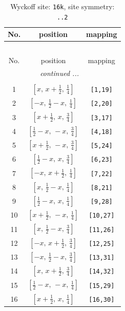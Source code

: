 \documentclass[fleqn,8pt]{jsarticle}
\begin{document}
\begin{longtable}{ccc}
\caption{Wyckoff site: {\tt 16k}, site symmetry: {\tt ..2}}
 \\
 \hline \hline
No. & position & mapping \\ \hline \endfirsthead

\multicolumn{2}{l}{\tablename\ \thetable{}} \\
 \hline \hline
No. & position & mapping \\ \hline \endhead

 \hline \hline
\multicolumn{2}{r}{\footnotesize\it continued ...} \\ \endfoot

 \hline \hline
\multicolumn{2}{r}{} \\ \endlastfoot

1 & $\left[ x,\, x + \frac{1}{2},\, \frac{1}{4} \right]$ & {\tt [1,19]} \\ \hline
2 & $\left[ - x,\, \frac{1}{2} - x,\, \frac{1}{4} \right]$ & {\tt [2,20]} \\ \hline
3 & $\left[ x + \frac{1}{2},\, x,\, \frac{3}{4} \right]$ & {\tt [3,17]} \\ \hline
4 & $\left[ \frac{1}{2} - x,\, - x,\, \frac{3}{4} \right]$ & {\tt [4,18]} \\ \hline
5 & $\left[ x + \frac{1}{2},\, - x,\, \frac{3}{4} \right]$ & {\tt [5,24]} \\ \hline
6 & $\left[ \frac{1}{2} - x,\, x,\, \frac{3}{4} \right]$ & {\tt [6,23]} \\ \hline
7 & $\left[ - x,\, x + \frac{1}{2},\, \frac{1}{4} \right]$ & {\tt [7,22]} \\ \hline
8 & $\left[ x,\, \frac{1}{2} - x,\, \frac{1}{4} \right]$ & {\tt [8,21]} \\ \hline
9 & $\left[ \frac{1}{2} - x,\, x,\, \frac{1}{4} \right]$ & {\tt [9,28]} \\ \hline
10 & $\left[ x + \frac{1}{2},\, - x,\, \frac{1}{4} \right]$ & {\tt [10,27]} \\ \hline
11 & $\left[ x,\, \frac{1}{2} - x,\, \frac{3}{4} \right]$ & {\tt [11,26]} \\ \hline
12 & $\left[ - x,\, x + \frac{1}{2},\, \frac{3}{4} \right]$ & {\tt [12,25]} \\ \hline
13 & $\left[ - x,\, \frac{1}{2} - x,\, \frac{3}{4} \right]$ & {\tt [13,31]} \\ \hline
14 & $\left[ x,\, x + \frac{1}{2},\, \frac{3}{4} \right]$ & {\tt [14,32]} \\ \hline
15 & $\left[ \frac{1}{2} - x,\, - x,\, \frac{1}{4} \right]$ & {\tt [15,29]} \\ \hline
16 & $\left[ x + \frac{1}{2},\, x,\, \frac{1}{4} \right]$ & {\tt [16,30]} \\
\end{longtable}
\end{document}
